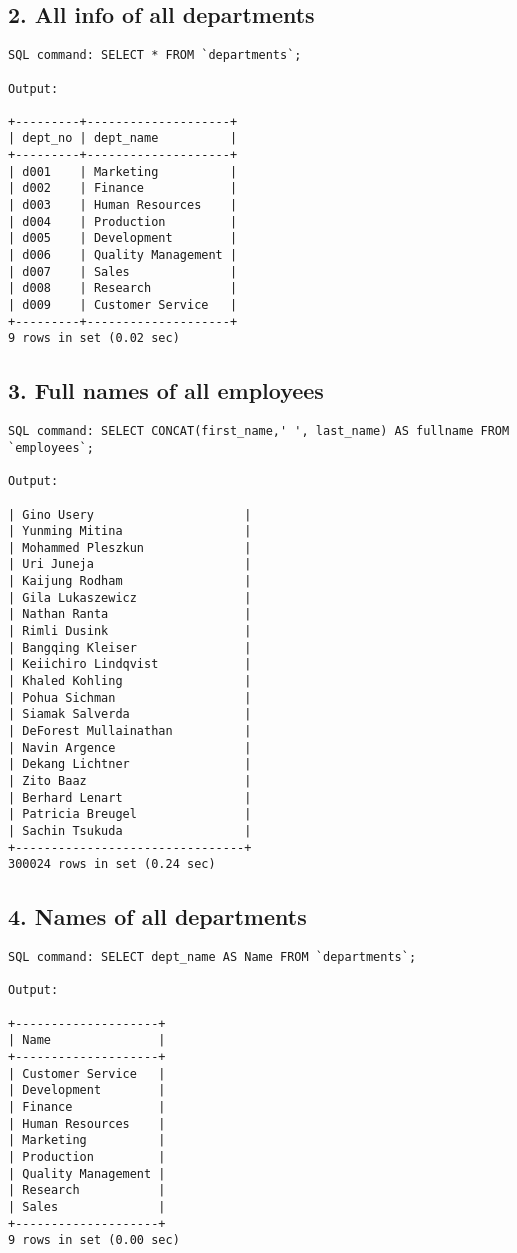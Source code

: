 \documentclass{report}
\begin{document}
\subsection*{2. All info of all departments}
\begin{lstlisting}
SQL command: SELECT * FROM `departments`;

Output:

+---------+--------------------+
| dept_no | dept_name          |
+---------+--------------------+
| d001    | Marketing          |
| d002    | Finance            |
| d003    | Human Resources    |
| d004    | Production         |
| d005    | Development        |
| d006    | Quality Management |
| d007    | Sales              |
| d008    | Research           |
| d009    | Customer Service   |
+---------+--------------------+
9 rows in set (0.02 sec)

\end{lstlisting}

\subsection*{3. Full names of all employees}
\begin{lstlisting}
SQL command: SELECT CONCAT(first_name,' ', last_name) AS fullname FROM `employees`;

Output:

| Gino Usery                     |
| Yunming Mitina                 |
| Mohammed Pleszkun              |
| Uri Juneja                     |
| Kaijung Rodham                 |
| Gila Lukaszewicz               |
| Nathan Ranta                   |
| Rimli Dusink                   |
| Bangqing Kleiser               |
| Keiichiro Lindqvist            |
| Khaled Kohling                 |
| Pohua Sichman                  |
| Siamak Salverda                |
| DeForest Mullainathan          |
| Navin Argence                  |
| Dekang Lichtner                |
| Zito Baaz                      |
| Berhard Lenart                 |
| Patricia Breugel               |
| Sachin Tsukuda                 |
+--------------------------------+
300024 rows in set (0.24 sec)

\end{lstlisting}

\subsection*{4. Names of all departments}
\begin{lstlisting}
SQL command: SELECT dept_name AS Name FROM `departments`;

Output:

+--------------------+
| Name               |
+--------------------+
| Customer Service   |
| Development        |
| Finance            |
| Human Resources    |
| Marketing          |
| Production         |
| Quality Management |
| Research           |
| Sales              |
+--------------------+
9 rows in set (0.00 sec)

\end{lstlisting}
\end{document}
